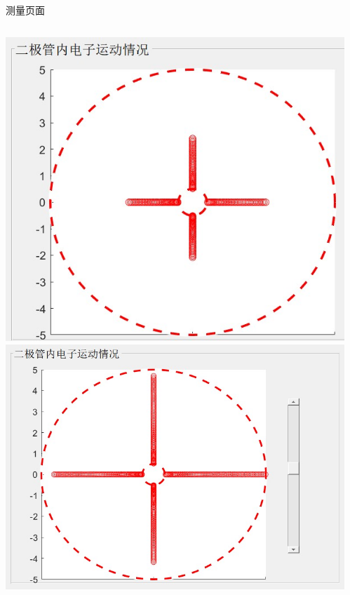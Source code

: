 \documentclass{beamer}
\begin{document}
    \begin{frame}{测量页面}{\thesection \, \secname}
        \begin{columns}
            \begin{column}{0.3\textwidth}
                \includegraphics[scale=0.35]{gallery/move1.jpg}
                \includegraphics[scale=0.35]{gallery/move2.jpg}
            \end{column}
            \begin{column}{0.3\textwidth}

\end{column}
\end{columns}
\end{frame}
\end{document}
